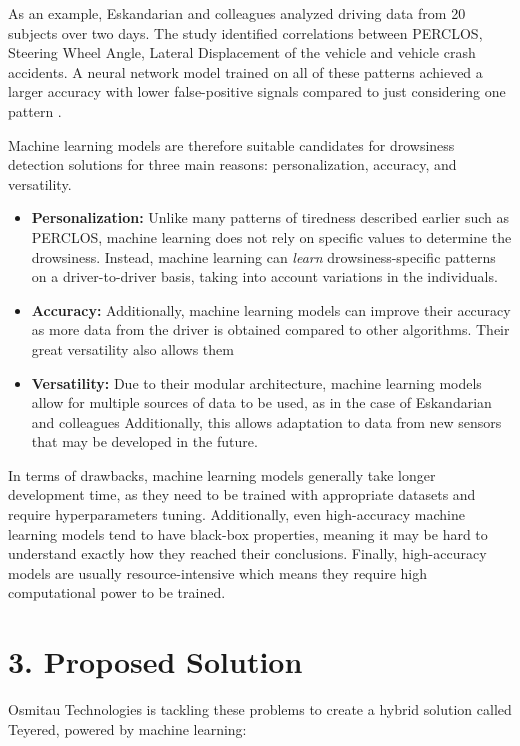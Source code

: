 \documentclass[a4paper, 12pt]{extarticle}
\begin{document}
As an example, Eskandarian and colleagues analyzed driving data from 20
subjects over two days. The study identified correlations between
PERCLOS, Steering Wheel Angle, Lateral Displacement of the vehicle and
vehicle crash accidents. A neural network model trained on all of these
patterns achieved a larger accuracy with lower false-positive signals
compared to just considering one pattern \cite{eskandarian_evaluation_2007}.

Machine learning models are therefore suitable candidates for drowsiness
detection solutions for three main reasons: personalization, accuracy,
and versatility.

\begin{itemize}
\item
  \textbf{Personalization:} Unlike many patterns of tiredness described
  earlier such as PERCLOS, machine learning does not rely on specific
  values to determine the drowsiness. Instead, machine learning can
  \emph{learn} drowsiness-specific patterns on a driver-to-driver basis,
  taking into account variations in the individuals.
\item
  \textbf{Accuracy:} Additionally, machine learning models can improve
  their accuracy as more data from the driver is obtained compared to
  other algorithms. Their great versatility also allows them
\item
  \textbf{Versatility:} Due to their modular architecture, machine
  learning models allow for multiple sources of data to be used, as in
  the case of Eskandarian and colleagues Additionally, this allows
  adaptation to data from new sensors that may be developed in the
  future.
\end{itemize}

In terms of drawbacks, machine learning models generally take longer
development time, as they need to be trained with appropriate datasets
and require hyperparameters tuning. Additionally, even high-accuracy
machine learning models tend to have black-box properties, meaning it
may be hard to understand exactly how they reached their conclusions.
Finally, high-accuracy models are usually resource-intensive which means
they require high computational power to be trained.

\hypertarget{proposed-solution}{%
\section{3. Proposed Solution}\label{proposed-solution}}

Osmitau Technologies is tackling these problems to create a hybrid
solution called Teyered, powered by machine learning:
\end{document}
